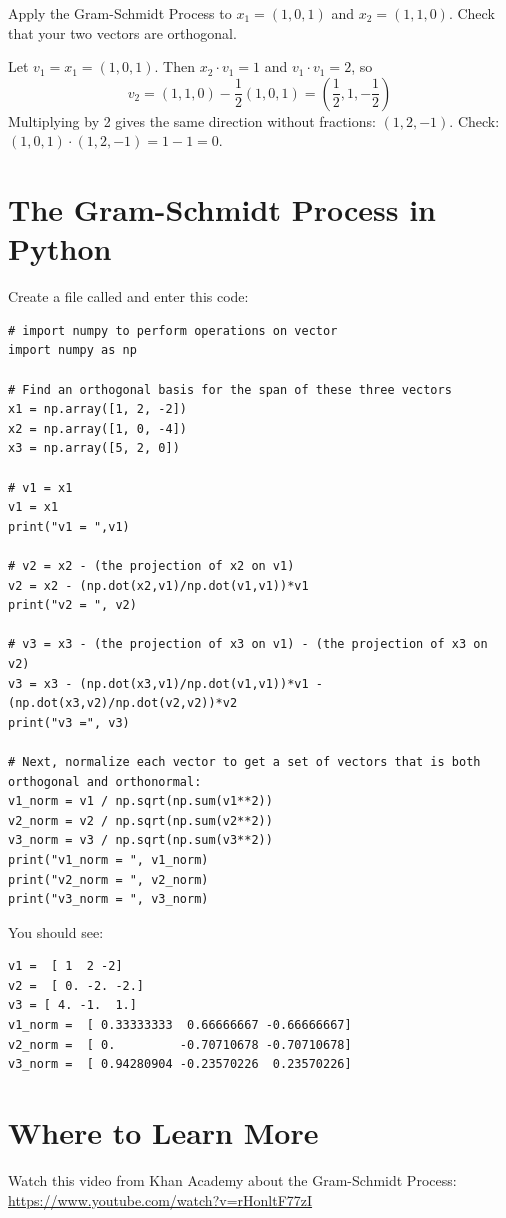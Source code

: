 \begin{Exercise}[title={Gram-Schmidt with Two Vectors}, label=gram_schmidt2]
    Apply the Gram-Schmidt Process to $x_1 = (1, 0, 1)$ and $x_2 = (1, 1, 0)$. Check that your two vectors are orthogonal.
\end{Exercise}
\begin{Answer}[ref=gram_schmidt2]
	Let $v_1 = x_1 = (1, 0, 1)$. Then $x_2 \cdot v_1 = 1$ and $v_1 \cdot v_1 = 2$, so
	$$v_2 = (1, 1, 0) - \frac{1}{2}(1, 0, 1) = \left(\frac{1}{2}, 1, -\frac{1}{2}\right)$$
	Multiplying by 2 gives the same direction without fractions: $(1, 2, -1)$. Check: $(1, 0, 1) \cdot (1, 2, -1) = 1 - 1 = 0$.
\end{Answer}

\section{The Gram-Schmidt Process in Python}
Create a file called  and enter this code:
\begin{verbatim}
# import numpy to perform operations on vector
import numpy as np

# Find an orthogonal basis for the span of these three vectors  
x1 = np.array([1, 2, -2]) 
x2 = np.array([1, 0, -4]) 
x3 = np.array([5, 2, 0])    
   
# v1 = x1
v1 = x1
print("v1 = ",v1)

# v2 = x2 - (the projection of x2 on v1)
v2 = x2 - (np.dot(x2,v1)/np.dot(v1,v1))*v1
print("v2 = ", v2)

# v3 = x3 - (the projection of x3 on v1) - (the projection of x3 on v2)
v3 = x3 - (np.dot(x3,v1)/np.dot(v1,v1))*v1 - (np.dot(x3,v2)/np.dot(v2,v2))*v2
print("v3 =", v3)

# Next, normalize each vector to get a set of vectors that is both orthogonal and orthonormal:
v1_norm = v1 / np.sqrt(np.sum(v1**2))
v2_norm = v2 / np.sqrt(np.sum(v2**2))
v3_norm = v3 / np.sqrt(np.sum(v3**2))
print("v1_norm = ", v1_norm)
print("v2_norm = ", v2_norm)
print("v3_norm = ", v3_norm)
\end{verbatim}

You should see:
\begin{verbatim}
v1 =  [ 1  2 -2]
v2 =  [ 0. -2. -2.]
v3 = [ 4. -1.  1.]
v1_norm =  [ 0.33333333  0.66666667 -0.66666667]
v2_norm =  [ 0.         -0.70710678 -0.70710678]
v3_norm =  [ 0.94280904 -0.23570226  0.23570226]
\end{verbatim}

\section{Where to Learn More}
Watch this video from Khan Academy about the Gram-Schmidt Process: \url{https://www.youtube.com/watch?v=rHonltF77zI}
